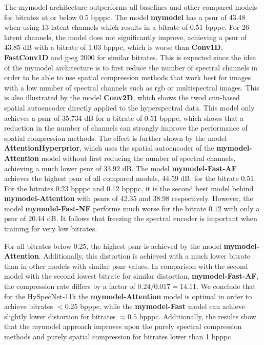 The \ac{mymodel} architecture outperforms all baselines and other compared models for bitrates at or below 0.5 \ac{bpppc}. The model \textbf{\ac{mymodel}} has a \ac{psnr} of 43.48 when using 13 latent channels which results in a bitrate of 0.51 \ac{bpppc}. For 26 latent channels, the model does not significantly improve, achieving a \ac{psnr} of 43.85 dB with a bitrate of 1.03 \ac{bpppc}, which is worse than \textbf{Conv1D}, \textbf{FastConv1D} and \ac{jpeg} 2000 for similar bitrates. This is expected since the idea of the \ac{mymodel} architecture is to first reduce the number of spectral channels in order to be able to use spatial compression methods that work best for images with a low number of spectral channels such as \ac{rgb} or multispectral images. This is also illustrated by the model \textbf{Conv2D}, which shows the \ac{twod} \ac{cnn}-based spatial autoencoder directly applied to the hyperspectral data. This model only achieves a \ac{psnr} of 35.734 dB for a bitrate of 0.51 \ac{bpppc}, which shows that a reduction in the number of channels can strongly improve the performance of spatial compression methods. The effect is further shown by the model \textbf{AttentionHyperprior}, which uses the spatial autoencoder of the \textbf{\ac{mymodel}-Attention} model without first reducing the number of spectral channels, achieving a much lower \ac{psnr} of 33.92 dB. The model \textbf{\ac{mymodel}-Fast-AF} achieves the highest \ac{psnr} of all compared models, 44.59 dB, for the bitrate 0.51. For the bitrates 0.23 \ac{bpppc} and 0.12 \ac{bpppc}, it is the second best model behind \textbf{\ac{mymodel}-Attention} with \acp{psnr} of 42.35 and 38.98 respectively. However, the model \textbf{\ac{mymodel}-Fast-NF} performs much worse for the bitrate $0.12$ with only a \ac{psnr} of 20.44 dB. It follows that freezing the spectral encoder is important when training for very low bitrates.

For all bitrates below 0.25, the highest \ac{psnr} is achieved by the model \textbf{\ac{mymodel}-Attention}. Additionally, this distortion is achieved with a much lower bitrate than in other models with similar \ac{psnr} values. In comparison with the second model with the second lowest bitrate for similar distortion, \textbf{\ac{mymodel}-Fast-AF}, the compression rate differs by a factor of $0.24/0.017=14.11$. We conclude that for the HySpecNet-11k the \textbf{\ac{mymodel}-Attention} model is optimal in order to achieve bitrates $<0.25$ \ac{bpppc}, while the \textbf{\ac{mymodel}-Fast} model can achieve slightly lower distortion for bitrates $\approx 0.5$ \ac{bpppc}. Additionally, the results show that the \ac{mymodel} approach improves upon the purely spectral compression methods and purely spatial compression for bitrates lower than 1 \ac{bpppc}. 






